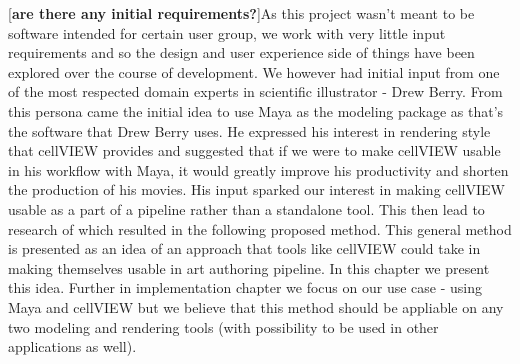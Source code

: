 \documentclass[
  digital, %
  table,   %
  nolof,     %
  nolot,     %
]{fithesis3}
\begin{document}
[\textbf{are there any initial requirements?}]As this project wasn't meant to be software intended for certain user group, we work with very little input requirements and so the design and user experience side of things have been explored over the course of development. We however had initial input from one of the most respected domain experts in scientific illustrator - Drew Berry. From this persona came the initial idea to use Maya as the modeling package as that's the software that Drew Berry uses. He expressed his interest in rendering style that cellVIEW provides and suggested that if we were to make cellVIEW usable in his workflow with Maya, it would greatly improve his productivity and shorten the production of his movies. His input sparked our interest in making cellVIEW usable as a part of a pipeline rather than a standalone tool. This then lead to research of which resulted in the following proposed method. This general method is presented as an idea of an approach that tools like cellVIEW could take in making themselves usable in art authoring pipeline. In this chapter we present this idea. Further in implementation chapter we focus on our use case - using Maya and cellVIEW but we believe that this method should be appliable on any two modeling and rendering tools (with possibility to be used in other applications as well).
\end{document}
